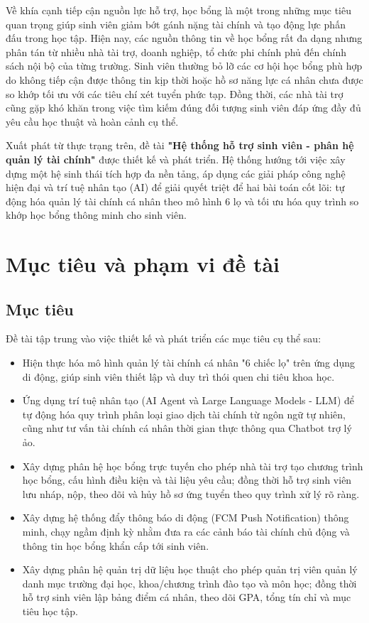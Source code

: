 Về khía cạnh tiếp cận nguồn lực hỗ trợ, học bổng là một trong những mục tiêu quan trọng giúp sinh viên giảm bớt gánh nặng tài chính và tạo động lực phấn đấu trong học tập. Hiện nay, các nguồn thông tin về học bổng rất đa dạng nhưng phân tán từ nhiều nhà tài trợ, doanh nghiệp, tổ chức phi chính phủ đến chính sách nội bộ của từng trường. Sinh viên thường bỏ lỡ các cơ hội học bổng phù hợp do không tiếp cận được thông tin kịp thời hoặc hồ sơ năng lực cá nhân chưa được so khớp tối ưu với các tiêu chí xét tuyển phức tạp. Đồng thời, các nhà tài trợ cũng gặp khó khăn trong việc tìm kiếm đúng đối tượng sinh viên đáp ứng đầy đủ yêu cầu học thuật và hoàn cảnh cụ thể.

Xuất phát từ thực trạng trên, đề tài \textbf{"Hệ thống hỗ trợ sinh viên - phân hệ quản lý tài chính"} được thiết kế và phát triển. Hệ thống hướng tới việc xây dựng một hệ sinh thái tích hợp đa nền tảng, áp dụng các giải pháp công nghệ hiện đại và trí tuệ nhân tạo (AI) để giải quyết triệt để hai bài toán cốt lõi: tự động hóa quản lý tài chính cá nhân theo mô hình 6 lọ và tối ưu hóa quy trình so khớp học bổng thông minh cho sinh viên.

\section{Mục tiêu và phạm vi đề tài}
\subsection{Mục tiêu}
Đề tài tập trung vào việc thiết kế và phát triển các mục tiêu cụ thể sau:
\begin{itemize}
    \item Hiện thực hóa mô hình quản lý tài chính cá nhân "6 chiếc lọ" trên ứng dụng di động, giúp sinh viên thiết lập và duy trì thói quen chi tiêu khoa học.
    \item Ứng dụng trí tuệ nhân tạo (AI Agent và Large Language Models - LLM) để tự động hóa quy trình phân loại giao dịch tài chính từ ngôn ngữ tự nhiên, cũng như tư vấn tài chính cá nhân thời gian thực thông qua Chatbot trợ lý ảo.
    \item Xây dựng phân hệ học bổng trực tuyến cho phép nhà tài trợ tạo chương trình học bổng, cấu hình điều kiện và tài liệu yêu cầu; đồng thời hỗ trợ sinh viên lưu nháp, nộp, theo dõi và hủy hồ sơ ứng tuyển theo quy trình xử lý rõ ràng.
    \item Xây dựng hệ thống đẩy thông báo di động (FCM Push Notification) thông minh, chạy ngầm định kỳ nhằm đưa ra các cảnh báo tài chính chủ động và thông tin học bổng khẩn cấp tới sinh viên.
    \item Xây dựng phân hệ quản trị dữ liệu học thuật cho phép quản trị viên quản lý danh mục trường đại học, khoa/chương trình đào tạo và môn học; đồng thời hỗ trợ sinh viên lập bảng điểm cá nhân, theo dõi GPA, tổng tín chỉ và mục tiêu học tập.
\end{itemize}

